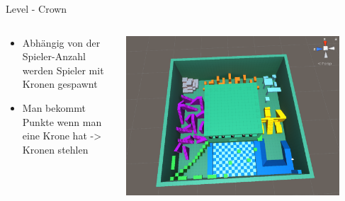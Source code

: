 \documentclass[xcolor=dvipsnames]{beamer}
\begin{document}
\begin{frame}{Level - Crown}
\begin{columns}
\begin{column}{0.5\textwidth}
	\begin{itemize}
		\item Abhängig von der Spieler-Anzahl werden Spieler mit Kronen gespawnt 
		\item Man bekommt Punkte wenn man eine Krone hat -> Kronen stehlen
	\end{itemize}
\end{column}
\begin{column}{0.5\textwidth} 
	\begin{center}
		\includegraphics[width=0.9\textwidth]{level_crown.png}
	\end{center}
\end{column}
\end{columns}

\end{frame}
\end{document}

